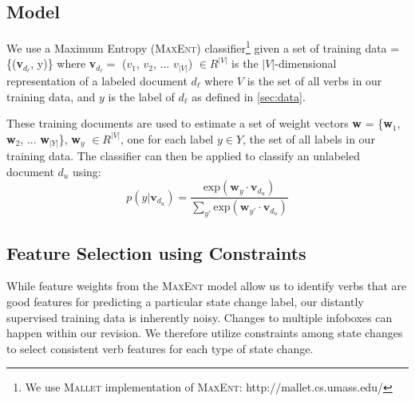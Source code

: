 
\subsection{Model}
We use a Maximum Entropy (\textsc{MaxEnt}) classifier\footnote{We use \textsc{Mallet} implementation of \textsc{MaxEnt}: http://mallet.cs.umass.edu/} given a set of training data = \{(\textbf{v}$_{d_{\ell}}$, y)\} where \textbf{v}$_{d_{\ell}} =$ ($v_1$, $v_2$, ... $v_{|V|}$) $\in R^{|V|}$ is the $|V|$-dimensional representation of a labeled document $d_{\ell}$ where $V$ is the set of all verbs in our training data, and $y$ is the label of $d_{\ell}$ as defined in \ref{sec:data}.

These training documents are used to estimate a set of weight vectors \textbf{w} = \{\textbf{w}$_1$, \textbf{w}$_2$, ... \textbf{w}$_{|Y|}$\}, \textbf{w}$_y$ $\in R^{|V|}$, one for each label $y \in Y$, the set of all labels in our training data. The classifier can then be applied to classify an unlabeled document $d_{\textit{u}}$ using: 
 \begin{equation}
	p(y|\textbf{v}_{d_{\textit{u}}}) = \frac{\mathrm{exp}  (\textbf{w}_{y} \cdot \textbf{v}_{d_{\textit{u}}})}{\sum_{y'} \mathrm{exp} (\textbf{w}_{y'} \cdot \textbf{v}_{d_{\textit{u}}})} \label{eqn:maxent}
\end{equation}
\subsection{Feature Selection using Constraints}

While feature weights from the \textsc{MaxEnt} model allow us to identify verbs that are good features for predicting a particular state change label, our distantly supervised training data is inherently noisy. Changes to multiple infoboxes can happen within our revision.
We therefore   utilize constraints among state changes to select consistent verb features for each type of state change. 

